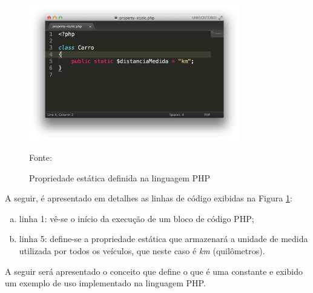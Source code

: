 \begin{figure}[h!tb]
	\caption{Propriedade estática definida na linguagem PHP}
	\label{fig:propriedadeEstatica}

	\centering
	\includegraphics[width=0.82\textwidth]{images/property-static.png}

	\centering
	\footnotesize Fonte: \fonteOAutor
\end{figure}

\FloatBarrier 	%

A seguir, é apresentado em detalhes as linhas de código exibidas na Figura 
\ref{fig:propriedadeEstatica}:

\begin{enumerate}[a)]
    \item linha 1: vê-se o início da execução de um bloco de código PHP;
    \item linha 5: define-se a propriedade estática que armazenará a unidade de
    medida utilizada por todos os veículos, que neste caso é \textit{km}
    (quilômetros).
\end{enumerate}

A seguir será apresentado o conceito que define o que é uma constante e
exibido um exemplo de uso implementado na linguagem \acs{PHP}.
